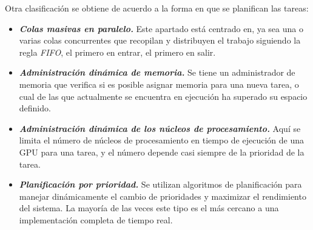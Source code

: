 \begin{itemize}
\begin{itemize}
	\end{itemize}




\end{itemize}
	
Otra clasificación se obtiene de acuerdo a la forma en que se planifican las tareas:

\begin{itemize}

\item \textbf{\textit{Colas masivas en paralelo.}}
	Este apartado está centrado en, ya sea una o varias colas concurrentes que recopilan y distribuyen el trabajo siguiendo la regla \textit{FIFO}, el primero en entrar, el primero en salir. 
	
\item \textbf{\textit{Administración dinámica de memoria.}}
	Se tiene un administrador de memoria que verifica si es posible asignar memoria para una nueva tarea, o cual de las que actualmente se encuentra en ejecución ha superado su espacio definido. 
	
\item \textbf{\textit{Administración dinámica de los núcleos de procesamiento.}}
	Aquí se limita el número de núcleos de procesamiento en tiempo de ejecución de una GPU para una tarea, y el número depende casi siempre de la prioridad de la tarea.

	
\item \textbf{\textit{Planificación por prioridad.}}
	Se utilizan algoritmos de planificación para manejar dinámicamente el cambio de prioridades y maximizar el rendimiento del sistema. La mayoría de las veces este tipo es el más cercano a una implementación completa de tiempo real.
	
\end{itemize}
     
